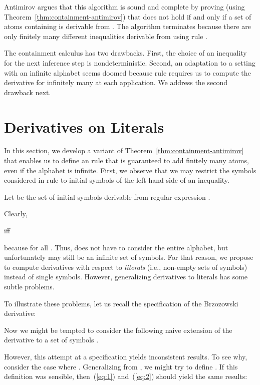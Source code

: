 Antimirov argues \cite[Theorem~8]{Antimirov1995} that this algorithm is sound and complete by proving
(using Theorem~\ref{thm:containment-antimirov})
that  does not hold if and only if a set of
atoms containing  is derivable from
.
The algorithm terminates because there are only finitely many
different inequalities derivable from 
using rule . 

The containment calculus  has two drawbacks. First, the
choice of an inequality for the next inference step is
nondeterministic. Second, an adaptation to a setting with an infinite alphabet seems
doomed because rule  requires us to compute the derivative for infinitely many
 at each application. We address the second
drawback next.



\section{Derivatives on Literals}
\label{sec:derivatives}

In this section, we develop a variant of
Theorem~\ref{thm:containment-antimirov} that enables us to define an
 rule that is guaranteed to add finitely many
atoms, even if the alphabet is infinite.
First, we observe that we may restrict the symbols considered
in rule  to initial symbols of the left hand side
of an inequality.
\begin{definition}[First]
  Let 
  be the set of initial symbols derivable from regular expression .
\end{definition}
Clearly,

iff

because  for all
. Thus,  does not
have to consider the entire alphabet, but unfortunately
 may still be an infinite set of 
symbols. For that reason, we propose to compute derivatives with
respect to \emph{literals} (i.e., non-empty sets of symbols) instead
of single symbols. However, generalizing derivatives to literals has
some subtle problems.

To illustrate these problems, let us recall the specification of the Brzozowski derivative:

Now we might be tempted to consider 
the following naive extension of the derivative to a set of symbols
.

However, this attempt at a specification yields inconsistent results. To see
why, consider the case where . Generalizing from 
,
we might try to define
.
If this definition was sensible, then~(\ref{eq:1}) and~(\ref{eq:2}) should yield
the same results:


